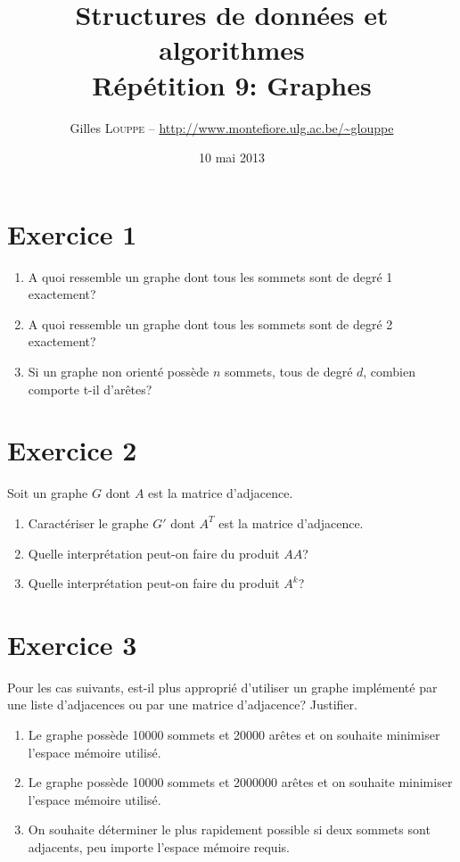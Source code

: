 \documentclass[a4paper,10pt]{article}
\title{
    \textbf{Structures de données et algorithmes}\\
    Répétition 9: Graphes
}
\author{Gilles \textsc{Louppe} -- \url{http://www.montefiore.ulg.ac.be/~glouppe}}
\date{10 mai 2013}
\begin{document}
\maketitle


\section*{Exercice 1}

\begin{enumerate}
\item A quoi ressemble un graphe dont tous les sommets sont de degré 1 exactement?
\item A quoi ressemble un graphe dont tous les sommets sont de degré 2 exactement?
\item Si un graphe non orienté possède $n$ sommets, tous de degré $d$, combien comporte t-il d'arêtes?
\end{enumerate}

\section*{Exercice 2}

Soit un graphe $G$ dont $A$ est la matrice d'adjacence.

\begin{enumerate}
\item Caractériser le graphe $G'$ dont $A^T$ est la matrice d'adjacence.
\item Quelle interprétation peut-on faire du produit $AA$?
\item Quelle interprétation peut-on faire du produit $A^k$?
\end{enumerate}

\section*{Exercice 3}

Pour les cas suivants, est-il plus approprié d'utiliser un graphe implémenté par une liste d'adjacences ou par une matrice d'adjacence? Justifier.

\begin{enumerate}
\item Le graphe possède 10000 sommets et 20000 arêtes et on souhaite minimiser l'espace mémoire utilisé.
\item Le graphe possède 10000 sommets et 2000000 arêtes et on souhaite minimiser l'espace mémoire utilisé.
\item On souhaite déterminer le plus rapidement possible si deux sommets sont adjacents, peu importe l'espace mémoire requis.
\end{enumerate}
\end{document}
